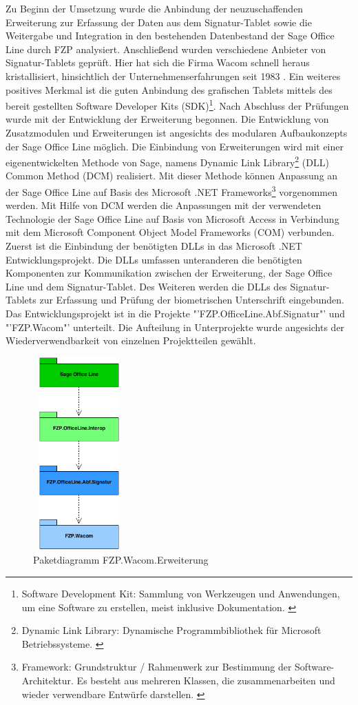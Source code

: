 Zu Beginn der Umsetzung wurde die Anbindung der neuzuschaffenden Erweiterung zur Erfassung der Daten aus dem Signatur-Tablet sowie die Weitergabe und Integration in den bestehenden Datenbestand der Sage Office Line durch FZP analysiert. Anschließend wurden verschiedene Anbieter von Signatur-Tablets geprüft. Hier hat sich die Firma Wacom schnell heraus kristallisiert, hinsichtlich der Unternehmenserfahrungen seit 1983 \cite{konzept1}. Ein weiteres positives Merkmal ist die guten Anbindung des grafischen Tablets mittels des bereit gestellten Software Developer Kits (SDK)\footnote{\label{foot:4}Software Development Kit: Sammlung von Werkzeugen und Anwendungen, um eine Software zu erstellen, meist inklusive Dokumentation. \cite{SDK}}. Nach Abschluss der Prüfungen wurde mit der Entwicklung der Erweiterung begonnen. Die Entwicklung von Zusatzmodulen und Erweiterungen ist angesichts des modularen Aufbaukonzepts der Sage Office Line möglich. Die Einbindung von Erweiterungen wird mit einer eigenentwickelten Methode von Sage, namens Dynamic Link Library\footnote{\label{foot:6}Dynamic Link Library: Dynamische Programmbibliothek für Microsoft Betriebssysteme. \cite{DLL}} (DLL) Common Method (DCM) realisiert. Mit dieser Methode können Anpassung an der Sage Office Line auf Basis des Microsoft .NET Frameworks\footnote{\label{foot:5}Framework: Grundstruktur / Rahmenwerk zur Bestimmung der 
Software-Architektur. Es besteht aus mehreren Klassen, die zusammenarbeiten und wieder verwendbare Entwürfe darstellen. \cite{framework}} vorgenommen werden. Mit Hilfe von DCM werden die Anpassungen mit der verwendeten Technologie der Sage Office Line auf Basis von Microsoft Access in Verbindung mit dem Microsoft Component Object Model Frameworks (COM) verbunden. Zuerst ist die Einbindung der benötigten DLLs in das Microsoft .NET Entwicklungsprojekt. Die DLLs umfassen unteranderen die benötigten Komponenten zur Kommunikation zwischen der Erweiterung, der Sage Office Line und dem Signatur-Tablet. Des Weiteren werden die DLLs des Signatur-Tablets zur Erfassung und Prüfung der biometrischen Unterschrift eingebunden. Das Entwicklungsprojekt ist in die Projekte "'FZP.OfficeLine.Abf.Signatur"' und "'FZP.Wacom"' unterteilt. Die Aufteilung in Unterprojekte wurde angesichts der Wiederverwendbarkeit von einzelnen Projektteilen gewählt.
\begin{figure}[!ht]
    \centering
    \includegraphics[height=210pt, width=100pt]{paketDiagrammNeu2.png}
    \caption[Paketdiagramm FZP.Wacom.Erweiterung]{\small{Paketdiagramm FZP.Wacom.Erweiterung}}
\end{figure}
